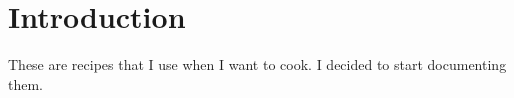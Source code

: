 \chapter{Introduction}
These are recipes that I use when I want to cook. I decided to start documenting them.
\clearpage